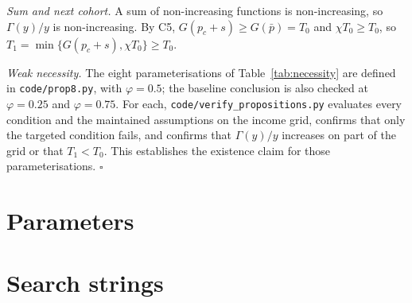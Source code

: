 \documentclass[12pt]{article}
\theoremstyle{remark}
\begin{document}
\emph{Sum and next cohort.} A sum of non-increasing functions is non-increasing, so $\Gamma(y)/y$ is non-increasing. By C5, $G(p_c+s)\ge G(\bar p)=T_0$ and $\chi T_0\ge T_0$, so $T_1=\min\{G(p_c+s),\chi T_0\}\ge T_0$.

\emph{Weak necessity.} The eight parameterisations of Table~\ref{tab:necessity} are defined in \texttt{code/prop8.py}, with $\varphi=0.5$; the baseline conclusion is also checked at $\varphi=0.25$ and $\varphi=0.75$. For each, \texttt{code/verify\_propositions.py} evaluates every condition and the maintained assumptions on the income grid, confirms that only the targeted condition fails, and confirms that $\Gamma(y)/y$ increases on part of the grid or that $T_1<T_0$. This establishes the existence claim for those parameterisations. $\square$

\section{Parameters}\label{app:params}


\section{Search strings}\label{app:search}

\end{document}
